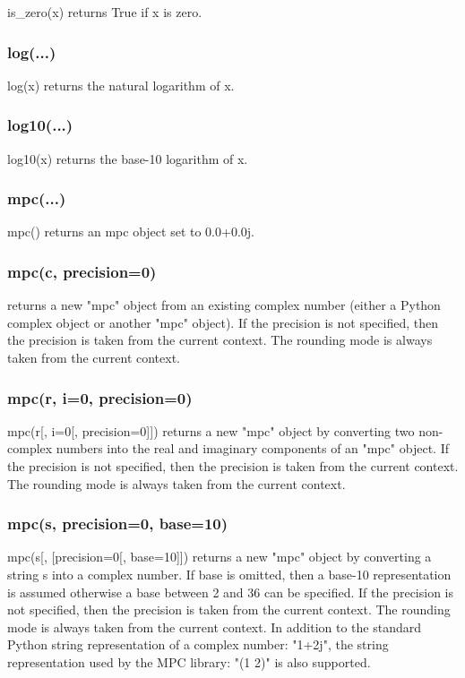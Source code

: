 is\_zero(x) returns True if x is zero.

\subsubsection{log(...)}

log(x) returns the natural logarithm of x.

\subsubsection{log10(...)}

log10(x) returns the base-10 logarithm of x.

\subsubsection{mpc(...)}

mpc() returns an mpc object set to 0.0+0.0j.

\subsubsection{mpc(c, precision=0)}
returns a new "mpc" object from an existing complex number (either a Python complex object or another "mpc" object). If the precision is not specified, then the precision is taken from the current context. The rounding mode is always taken from the current context.

\subsubsection{mpc(r, i=0, precision=0)}
mpc(r[, i=0[, precision=0]]) returns a new "mpc" object by converting two non-complex numbers
into the real and imaginary components of an "mpc" object. If the precision is not specified, then
the precision is taken from the current context. The rounding mode is always taken from the
current context.

\subsubsection{mpc(s, precision=0, base=10)}
mpc(s[, [precision=0[, base=10]]) returns a new "mpc" object by converting a string s into a
complex number. If base is omitted, then a base-10 representation is assumed otherwise a
base between 2 and 36 can be specified. If the precision is not specified, then the precision is
taken from the current context. The rounding mode is always taken from the current context.
In addition to the standard Python string representation of a complex number: "1+2j", the
string representation used by the MPC library: "(1 2)" is also supported.


